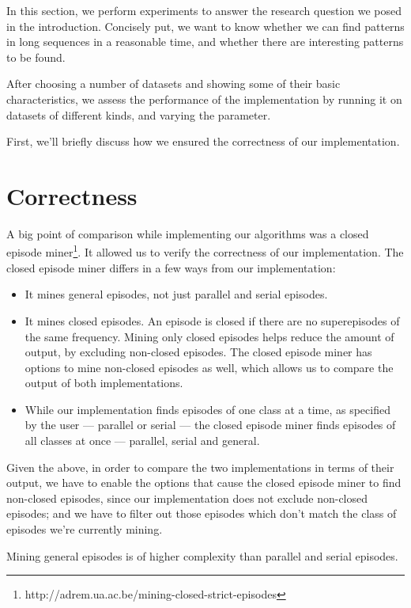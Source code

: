 In this section, we perform experiments to answer the research question we posed in the introduction. Concisely put, we want to know whether we can find patterns in long sequences in a reasonable time, and whether there are interesting patterns to be found.

After choosing a number of datasets and showing some of their basic characteristics, we assess the performance of the implementation by running it on datasets of different kinds, and varying the parameter.

First, we'll briefly discuss how we ensured the correctness of our implementation.

\section{Correctness}
\label{sec:experiments-correctness}

A big point of comparison while implementing our algorithms was a closed episode miner\footnote{http://adrem.ua.ac.be/mining-closed-strict-episodes}. It allowed us to verify the correctness of our implementation. The closed episode miner differs in a few ways from our implementation:

\begin{itemize}
\item It mines general episodes, not just parallel and serial episodes.
\item It mines closed episodes. An episode is closed if there are no superepisodes of the same frequency. Mining only closed episodes helps reduce the amount of output, by excluding non-closed episodes. The closed episode miner has options to mine non-closed episodes as well, which allows us to compare the output of both implementations.
\item While our implementation finds episodes of one class at a time, as specified by the user --- parallel or serial --- the closed episode miner finds episodes of all classes at once --- parallel, serial and general.
\end{itemize}

Given the above, in order to compare the two implementations in terms of their output, we have to enable the options that cause the closed episode miner to find non-closed episodes, since our implementation does not exclude non-closed episodes; and we have to filter out those episodes which don't match the class of episodes we're currently mining.

\iffalse
Mining general episodes is of higher complexity than parallel and serial episodes.

